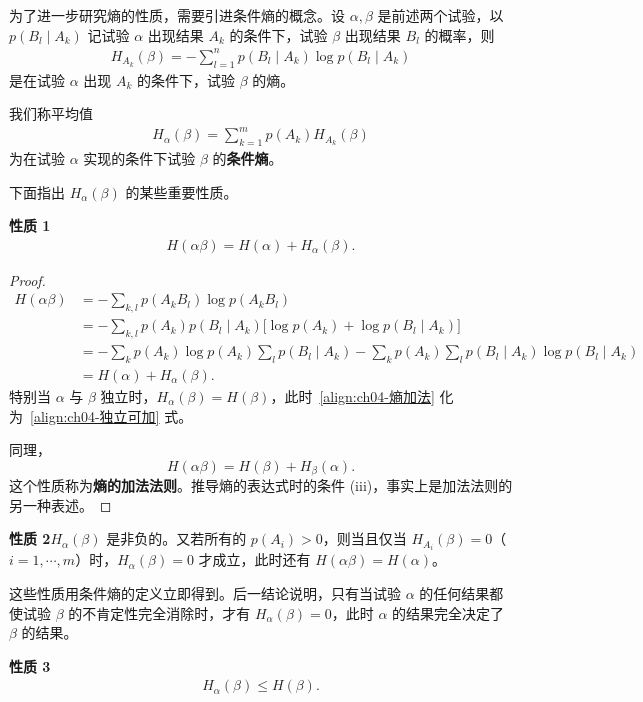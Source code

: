 \documentclass[../../main.tex]{subfiles}
\begin{document}
为了进一步研究熵的性质，需要引进条件熵的概念。设 $\alpha,\beta$ 是前述两个试验，以 $p(B_l\mid A_k)$ 记试验 $\alpha$ 出现结果 $A_k$ 的条件下，试验 $\beta$ 出现结果 $B_l$ 的概率，则
\begin{align}
H_{A_k}(\beta)=-\sum_{l=1}^n p(B_l\mid A_k)\log p(B_l\mid A_k)\label{align:ch04-条件熵单}
\end{align}
是在试验 $\alpha$ 出现 $A_k$ 的条件下，试验 $\beta$ 的熵。

我们称平均值
\begin{align}
H_\alpha(\beta)=\sum_{k=1}^m p(A_k)H_{A_k}(\beta)\label{align:ch04-条件熵平均}
\end{align}
为在试验 $\alpha$ 实现的条件下试验 $\beta$ 的\textbf{条件熵}。

下面指出 $H_\alpha(\beta)$ 的某些重要性质。

\noindent\textbf{性质 1}\quad
\begin{align}
H(\alpha\beta)=H(\alpha)+H_\alpha(\beta).\label{align:ch04-熵加法}
\end{align}

\begin{proof}
\begin{align*}
H(\alpha\beta)&=-\sum_{k,l}p(A_k B_l)\log p(A_k B_l)\\
&=-\sum_{k,l}p(A_k)p(B_l\mid A_k)\bigl[\log p(A_k)+\log p(B_l\mid A_k)\bigr]\\
&=-\sum_k p(A_k)\log p(A_k)\sum_l p(B_l\mid A_k)
-\sum_k p(A_k)\sum_l p(B_l\mid A_k)\log p(B_l\mid A_k)\\
&=H(\alpha)+H_\alpha(\beta).
\end{align*}
特别当 $\alpha$ 与 $\beta$ 独立时，$H_\alpha(\beta)=H(\beta)$，此时~\eqref{align:ch04-熵加法} 化为~\eqref{align:ch04-独立可加} 式。

同理，
\[
H(\alpha\beta)=H(\beta)+H_\beta(\alpha).
\]
这个性质称为\textbf{熵的加法法则}。推导熵的表达式时的条件 (iii)，事实上是加法法则的另一种表述。
\end{proof}

\noindent\textbf{性质 2}\quad $H_\alpha(\beta)$ 是非负的。又若所有的 $p(A_i)>0$，则当且仅当 $H_{A_i}(\beta)=0$（$i=1,\cdots,m$）时，$H_\alpha(\beta)=0$ 才成立，此时还有 $H(\alpha\beta)=H(\alpha)$。

这些性质用条件熵的定义立即得到。后一结论说明，只有当试验 $\alpha$ 的任何结果都使试验 $\beta$ 的不肯定性完全消除时，才有 $H_\alpha(\beta)=0$，此时 $\alpha$ 的结果完全决定了 $\beta$ 的结果。

\noindent\textbf{性质 3}\quad
\begin{align}
H_\alpha(\beta)\leqslant H(\beta).\label{align:ch04-条件熵不增}
\end{align}
\end{document}
